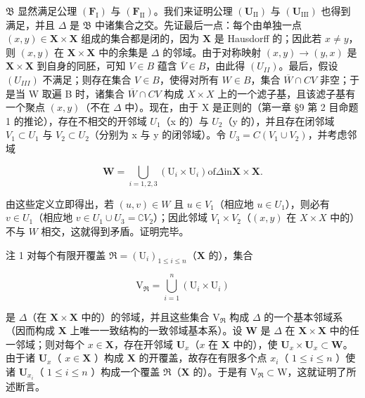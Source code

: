 \(\mathfrak{B}\) 显然满足公理 \((\mathbf{F}_{\mathrm{I}})\) 与 \((\mathbf{F}_{\mathrm{II}})\)。我们来证明公理 \((\mathbf{U}_{\mathrm{II}})\) 与 \((\mathbf{U}_{\mathrm{III}})\) 也得到满足，并且 \(\Delta\) 是 \(\mathfrak{B}\) 中诸集合之交。先证最后一点：每个由单独一点 \((x, y) \in \mathbf{X} \times \mathbf{X}\) 组成的集合都是闭的，因为 \(\mathbf{X}\) 是 Hausdorff 的；因此若 \(x \neq y\)，则 \((x, y)\) 在 \(\mathbf{X} \times \mathbf{X}\) 中的余集是 \(\Delta\) 的邻域。由于对称映射 \((x, y) \to (y, x)\) 是 \(\mathbf{X} \times \mathbf{X}\) 到自身的同胚，可知 \(V \in B\) 蕴含 \(\overline{V} \in B\)，由此得 \((U_{II})\)。最后，假设 \((U_{III})\) 不满足；则存在集合 \(V \in B\)，使得对所有 \(W \in B\)，集合 \(\overline{W} \cap C V\) 非空；于是当 W 取遍 B 时，诸集合 \(\overline{W} \cap C V\) 构成 \(X \times X\) 上的一个滤子基，且该滤子基有一个聚点 \((x, y)\)（不在 \(\Delta\) 中）。现在，由于 X 是正则的（第一章 §9 第 2 目命题 1 的推论），存在不相交的开邻域 \(U_{1}\)（x 的）与 \(U_{2}\)（y 的），并且存在闭邻域 \(V_{1} \subset U_{1}\) 与 \(V_{2} \subset U_{2}\)（分别为 x 与 y 的闭邻域）。令 \(U_{3} = C(V_{1} \cup V_{2})\)，并考虑邻域

\[
\mathbf {W} = \bigcup_ {i = 1, 2, 3} (\mathrm{U} _ {i} \times \mathrm{U} _ {i}) \text {of} \Delta \text {in} \mathbf {X} \times \mathbf {X}.
\]

由这些定义立即得出，若 \((u, v) \in W\) 且 \(u \in V_1\)（相应地 \(u \in U_1\)），则必有 \(v \in U_1\)（相应地 \(v \in U_1 \cup U_3 = \complement V_2\)）；因此邻域 \(V_1 \times V_2\)（\((x, y)\) 在 \(X \times X\) 中的）不与 \(W\) 相交，这就得到矛盾。证明完毕。

注 1 对每个有限开覆盖 \(\Re = (\mathrm{U}_i)_{1\leqslant i\leqslant n}\)（\(\mathbf{X}\) 的），集合

\[
\mathrm{V} _ {\Re} = \bigcup_ {i = 1} ^ {n} \left(\mathrm{U} _ {i} \times \mathrm{U} _ {i}\right)
\]

是 \(\Delta\)（在 \(\mathbf{X} \times \mathbf{X}\) 中的）的邻域，并且这些集合 \(\mathrm{V}_{\Re}\) 构成 \(\Delta\) 的一个基本邻域系（因而构成 \(\mathbf{X}\) 上唯一一致结构的一致邻域基本系）。设 \(\mathbf{W}\) 是 \(\Delta\) 在 \(\mathbf{X} \times \mathbf{X}\) 中的任一邻域；则对每个 \(x \in \mathbf{X}\)，存在开邻域 \(\mathbf{U}_x\)（\(x\) 在 \(\mathbf{X}\) 中的），使 \(\mathbf{U}_x \times \mathbf{U}_x \subset \mathbf{W}\)。由于诸 \(\mathbf{U}_x\)（ \(x \in \mathbf{X}\) ）构成 \(\mathbf{X}\) 的开覆盖，故存在有限多个点 \(x_i\)（ \(1 \leqslant i \leqslant n\) ）使诸 \(\mathbf{U}_{x_i}\)（ \(1 \leqslant i \leqslant n\) ）构成一个覆盖 \(\Re\)（\(\mathbf{X}\) 的）。于是有 \(\mathrm{V}_{\Re} \subset \mathrm{W}\)，这就证明了所述断言。

